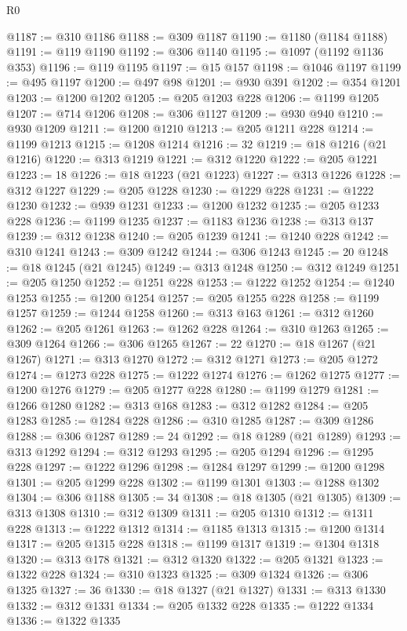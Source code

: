 \begin{lexlean}{R0}
\begin{coremodule}
@1187 := @310 @1186
@1188 := @309 @1187
@1190 := @1180 (@1184 @1188)
@1191 := @119 @1190
@1192 := @306 @1140
@1195 := @1097 (@1192 @1136 @353)
@1196 := @119 @1195
@1197 := @15 @157
@1198 := @1046 @1197
@1199 := @495 @1197
@1200 := @497 @98
@1201 := @930 @391
@1202 := @354 @1201
@1203 := @1200 @1202
@1205 := @205 @1203 @228
@1206 := @1199 @1205
@1207 := @714 @1206
@1208 := @306 @1127
@1209 := @930 @940
@1210 := @930 @1209
@1211 := @1200 @1210
@1213 := @205 @1211 @228
@1214 := @1199 @1213
@1215 := @1208 @1214
@1216 := 32
@1219 := @18 @1216 (@21 @1216)
@1220 := @313 @1219
@1221 := @312 @1220
@1222 := @205 @1221
@1223 := 18
@1226 := @18 @1223 (@21 @1223)
@1227 := @313 @1226
@1228 := @312 @1227
@1229 := @205 @1228
@1230 := @1229 @228
@1231 := @1222 @1230
@1232 := @939 @1231
@1233 := @1200 @1232
@1235 := @205 @1233 @228
@1236 := @1199 @1235
@1237 := @1183 @1236
@1238 := @313 @137
@1239 := @312 @1238
@1240 := @205 @1239
@1241 := @1240 @228
@1242 := @310 @1241
@1243 := @309 @1242
@1244 := @306 @1243
@1245 := 20
@1248 := @18 @1245 (@21 @1245)
@1249 := @313 @1248
@1250 := @312 @1249
@1251 := @205 @1250
@1252 := @1251 @228
@1253 := @1222 @1252
@1254 := @1240 @1253
@1255 := @1200 @1254
@1257 := @205 @1255 @228
@1258 := @1199 @1257
@1259 := @1244 @1258
@1260 := @313 @163
@1261 := @312 @1260
@1262 := @205 @1261
@1263 := @1262 @228
@1264 := @310 @1263
@1265 := @309 @1264
@1266 := @306 @1265
@1267 := 22
@1270 := @18 @1267 (@21 @1267)
@1271 := @313 @1270
@1272 := @312 @1271
@1273 := @205 @1272
@1274 := @1273 @228
@1275 := @1222 @1274
@1276 := @1262 @1275
@1277 := @1200 @1276
@1279 := @205 @1277 @228
@1280 := @1199 @1279
@1281 := @1266 @1280
@1282 := @313 @168
@1283 := @312 @1282
@1284 := @205 @1283
@1285 := @1284 @228
@1286 := @310 @1285
@1287 := @309 @1286
@1288 := @306 @1287
@1289 := 24
@1292 := @18 @1289 (@21 @1289)
@1293 := @313 @1292
@1294 := @312 @1293
@1295 := @205 @1294
@1296 := @1295 @228
@1297 := @1222 @1296
@1298 := @1284 @1297
@1299 := @1200 @1298
@1301 := @205 @1299 @228
@1302 := @1199 @1301
@1303 := @1288 @1302
@1304 := @306 @1188
@1305 := 34
@1308 := @18 @1305 (@21 @1305)
@1309 := @313 @1308
@1310 := @312 @1309
@1311 := @205 @1310
@1312 := @1311 @228
@1313 := @1222 @1312
@1314 := @1185 @1313
@1315 := @1200 @1314
@1317 := @205 @1315 @228
@1318 := @1199 @1317
@1319 := @1304 @1318
@1320 := @313 @178
@1321 := @312 @1320
@1322 := @205 @1321
@1323 := @1322 @228
@1324 := @310 @1323
@1325 := @309 @1324
@1326 := @306 @1325
@1327 := 36
@1330 := @18 @1327 (@21 @1327)
@1331 := @313 @1330
@1332 := @312 @1331
@1334 := @205 @1332 @228
@1335 := @1222 @1334
@1336 := @1322 @1335

\end{coremodule}
\end{lexlean}
